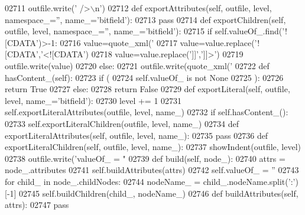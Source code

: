 \begin{DoxyCode}
{{{{{{{{{{{{{{{{{{{{{{{{{{{{{{{{{{{{{{{{{{{{{{{{{{{{{{{{{{{{{{{{{{{{{{{{{{{{{{{{{{{{{{{{{{{{{{{{{{{{{{{{{{{{{{{{{{{{{{{{{{{{{{{{{{{{{{{{{{{{{{{{{{{{{{{{{{{{{{{{{{{{{{{{{{{{{{{{{{{{{{{{{{{{{{{{02711             outfile.write(\textcolor{stringliteral}{' />\(\backslash\)n'})
02712     \textcolor{keyword}{def }exportAttributes(self, outfile, level, namespace\_='', name\_='bitfield'):
02713         \textcolor{keywordflow}{pass}
02714     \textcolor{keyword}{def }exportChildren(self, outfile, level, namespace\_='', name\_='bitfield'):
02715         \textcolor{keywordflow}{if} self.valueOf\_.find(\textcolor{stringliteral}{'![CDATA'})>-1:
02716             value=quote_xml(\textcolor{stringliteral}{'%
02717             value=value.replace(\textcolor{stringliteral}{'![CDATA'},\textcolor{stringliteral}{'<![CDATA'})
02718             value=value.replace(\textcolor{stringliteral}{']]'},\textcolor{stringliteral}{']]>'})
02719             outfile.write(value)
02720         \textcolor{keywordflow}{else}:
02721             outfile.write(quote_xml(\textcolor{stringliteral}{'%
02722     \textcolor{keyword}{def }hasContent_(self):
02723         \textcolor{keywordflow}{if} (
02724             self.valueOf_ \textcolor{keywordflow}{is} \textcolor{keywordflow}{not} \textcolor{keywordtype}{None}
02725             ):
02726             \textcolor{keywordflow}{return} \textcolor{keyword}{True}
02727         \textcolor{keywordflow}{else}:
02728             \textcolor{keywordflow}{return} \textcolor{keyword}{False}
02729     \textcolor{keyword}{def }exportLiteral(self, outfile, level, name\_='bitfield'):
02730         level += 1
02731         self.exportLiteralAttributes(outfile, level, name\_)
02732         \textcolor{keywordflow}{if} self.hasContent_():
02733             self.exportLiteralChildren(outfile, level, name\_)
02734     \textcolor{keyword}{def }exportLiteralAttributes(self, outfile, level, name\_):
02735         \textcolor{keywordflow}{pass}
02736     \textcolor{keyword}{def }exportLiteralChildren(self, outfile, level, name\_):
02737         showIndent(outfile, level)
02738         outfile.write(\textcolor{stringliteral}{'valueOf\_ = "%
02739     \textcolor{keyword}{def }build(self, node\_):
02740         attrs = node\_.attributes
02741         self.buildAttributes(attrs)
02742         self.valueOf_ = \textcolor{stringliteral}{''}
02743         \textcolor{keywordflow}{for} child\_ \textcolor{keywordflow}{in} node\_.childNodes:
02744             nodeName\_ = child\_.nodeName.split(\textcolor{stringliteral}{':'})[-1]
02745             self.buildChildren(child\_, nodeName\_)
02746     \textcolor{keyword}{def }buildAttributes(self, attrs):
02747         \textcolor{keywordflow}{pass}
}}}}}}}}}}}}}}}}}}}}}}}}}}}}}}}}}}}}}}}}}}}}}}}}}}}}}}}}}}}}}}}}}}}}}}}}}}}}}}}}}}}}}}}}}}}}}}}}}}}}}}}}}}}}}}}}}}}}}}}}}}}}}}}}}}}}}}}}}}}}}}}}}}}}}}}}}}}}}}}}}}}}}}}}}}}}}}}}}}}}}}}}}}}}}}}}}}}
\end{DoxyCode}
